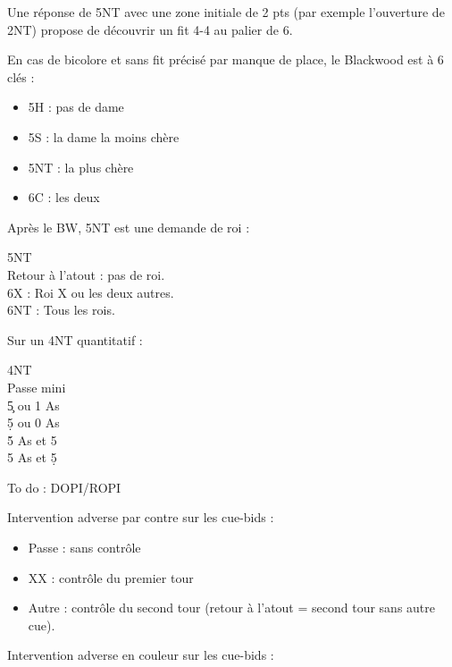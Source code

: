 \documentclass[a4paper]{article}
\begin{document}
Une réponse de 5NT avec une zone initiale de 2 pts (par exemple l'ouverture de 2NT) propose de découvrir un fit 4-4 au palier de 6.

En cas de bicolore et sans fit précisé par manque de place, le Blackwood est à 6 clés :

\begin{itemize}
\item 5H : pas de dame

\item 5S : la dame la moins chère

\item 5NT : la plus chère

\item 6C : les deux

\end{itemize}

Après le BW, 5NT est une demande de roi :

\begin{bidtable}
5NT\+\\
Retour \> à l'atout : pas de roi.\\
6X \> : Roi X ou les deux autres.\\
6NT \> : Tous les rois.\-
\end{bidtable}

Sur un 4NT quantitatif :

\begin{bidtable}
4NT\+\\
Passe \> mini\\
5\c {} ou 1 As\\
5\d {} ou 0 As\\
5\h {} As et 5\c \\
5\s {} As et 5\d \-
\end{bidtable}

To do : DOPI/ROPI

Intervention adverse par contre sur les cue-bids :

\begin{itemize}
\item Passe : sans contrôle

\item XX : contrôle du premier tour

\item Autre : contrôle du second tour (retour à l'atout = second tour sans autre cue).

\end{itemize}

Intervention adverse en couleur sur les cue-bids :
\end{document}
